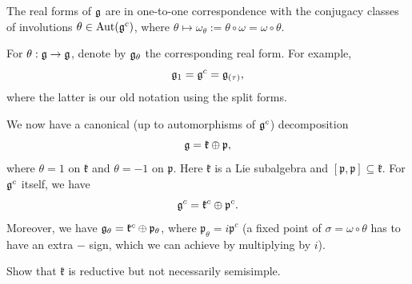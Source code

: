 \begin{theorem}
  The real forms of $\mathfrak{g}$ are in
  one-to-one correspondence with the
  conjugacy classes of involutions
  $\theta \in \operatorname{Aut}(\mathfrak{g}^c)$, where
  $\theta \mapsto \omega_\theta := \theta \circ \omega = \omega \circ \theta$.
\end{theorem}

\begin{remark}
  For $\theta : \mathfrak{g} \to \mathfrak{g}$, denote by
  $\mathfrak{g}_\theta$ the corresponding real form.
  For example,
  \[
    \mathfrak{g}_1 = \mathfrak{g}^c = \mathfrak{g}_{(\tau)},
  \]
  where the latter is our old notation
  using the split forms.
\end{remark}

\begin{remark}
  We now have a canonical (up to automorphisms of $\mathfrak{g}^c$)
  decomposition
  \[
    \mathfrak{g} = \mathfrak{k} \oplus \mathfrak{p},
  \]
  where $\theta = 1$ on $\mathfrak{k}$ and $\theta = -1$ on $\mathfrak{p}$.
  Here $\mathfrak{k}$ is a Lie subalgebra
  and $[\mathfrak{p}, \mathfrak{p}] \subseteq \mathfrak{k}$.
  For $\mathfrak{g}^c$ itself, we have
  \[
    \mathfrak{g}^c = \mathfrak{k}^c \oplus \mathfrak{p}^c.
  \]
  Moreover, we have
  $\mathfrak{g}_\theta = \mathfrak{k}^c \oplus \mathfrak{p}_\theta$,
  where $\mathfrak{p}_\theta = i \mathfrak{p}^c$ (a fixed point of $\sigma = \omega \circ \theta$ has to have an extra $-$ sign, which we can achieve by multiplying by $i$).
\end{remark}

\begin{exercise}
  Show that $\mathfrak{k}$ is reductive
  but not necessarily semisimple.
\end{exercise}
